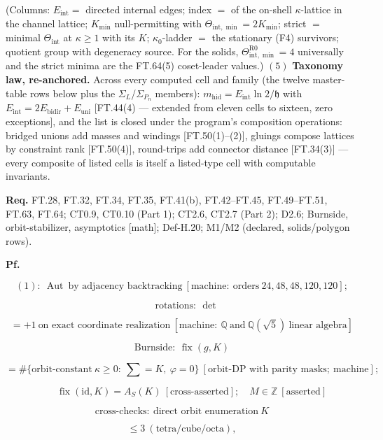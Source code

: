 \begin{theorem}
(Columns: $E_{\mathrm{int}}=$ directed internal edges; index $=$ of the on-shell $\kappa$-lattice in the channel lattice; $K_{\min}$ null-permitting with $\Theta_{\mathrm{int},\min}=2K_{\min}$; strict $=$ minimal $\Theta_{\mathrm{int}}$ at $\kappa\ge1$ with its $K$; $\kappa_0$-ladder $=$ the stationary (F4) survivors; quotient group with degeneracy source. For the solids, $\Theta_{\mathrm{int},\min}^{\mathrm{R0}}=4$ universally and the strict minima are the FT.64(5) coset-leader values.) $(5)$ \textbf{Taxonomy law, re-anchored.} Across every computed cell and family (the twelve master-table rows below plus the $\Sigma_L$/$\Sigma_{P_n}$ members): $m_{\mathrm{hid}}=E_{\mathrm{int}}\ln2/\mathfrak h$ with $E_{\mathrm{int}}=2E_{\mathrm{bidir}}+E_{\mathrm{uni}}$ [FT.44(4) — extended from eleven cells to sixteen, zero exceptions], and the list is closed under the program's composition operations: bridged unions add masses and windings [FT.50(1)–(2)], gluings compose lattices by constraint rank [FT.50(4)], round-trips add connector distance [FT.34(3)] — every composite of listed cells is itself a listed-type cell with computable invariants.

\textbf{Req.} FT.28, FT.32, FT.34, FT.35, FT.41(b), FT.42–FT.45, FT.49–FT.51, FT.63, FT.64; CT0.9, CT0.10 (Part 1); CT2.6, CT2.7 (Part 2); D2.6; Burnside, orbit-stabilizer, asymptotics [math]; Def-H.20; M1/M2 (declared, solids/polygon rows).

\textbf{Pf.}

\[
(1):\ \operatorname{Aut}\ \text{by adjacency backtracking}\ [\text{machine}:\ \text{orders}\ 24,48,48,120,120];
\]

\[
\quad\text{rotations}:\ \det
\]

\[
= +1\ \text{on exact coordinate realization}\ [\text{machine}:\ \mathbb Q\ \text{and}\ \mathbb Q(\sqrt5)\ \text{linear algebra}]
\]

\[
\text{Burnside}:\ \operatorname{fix}(g,K)
\]

\[
= \#\{\text{orbit-constant}\ \kappa\ge0:\ \textstyle\sum=K,\ \varphi=0\}\ [\text{orbit-DP with parity masks};\ \text{machine}];
\]

\[
\qquad \operatorname{fix}(\mathrm{id},K)=A_S(K)\ [\text{cross-asserted}];\quad M\in\mathbb Z\ [\text{asserted}]
\]

\[
\text{cross-checks}:\ \text{direct orbit enumeration}\ K
\]

\[
\le 3\ (\text{tetra/cube/octa}),
\]


\end{theorem}
